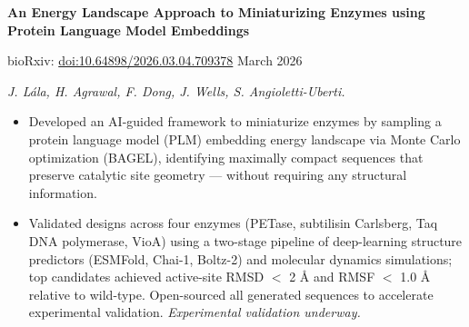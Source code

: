 \documentclass[10pt,a4paper,ragged2e]{altacv}
\begin{document}
{\small\textbf{An Energy Landscape Approach to Miniaturizing Enzymes using Protein Language Model Embeddings}}\par
\smallskip
{\footnotesize bioRxiv: \href{https://doi.org/10.64898/2026.03.04.709378}{doi:10.64898/2026.03.04.709378} \hfill March 2026\par\smallskip
\textit{J. L\'{a}la, H. Agrawal, F. Dong, J. Wells, S. Angioletti-Uberti.}\par\smallskip
\begin{itemize}
    \item {Developed an AI-guided framework to miniaturize enzymes by sampling a protein language model (PLM) embedding energy landscape via Monte Carlo optimization (BAGEL), identifying maximally compact sequences that preserve catalytic site geometry --- without requiring any structural information.}
    \item {Validated designs across four enzymes (PETase, subtilisin Carlsberg, Taq DNA polymerase, VioA) using a two-stage pipeline of deep-learning structure predictors (ESMFold, Chai-1, Boltz-2) and molecular dynamics simulations; top candidates achieved active-site RMSD $<$ 2 \AA{} and RMSF $<$ 1.0 \AA{} relative to wild-type. Open-sourced all generated sequences to accelerate experimental validation. \textit{Experimental validation underway.}}
\end{itemize}}
\end{document}
